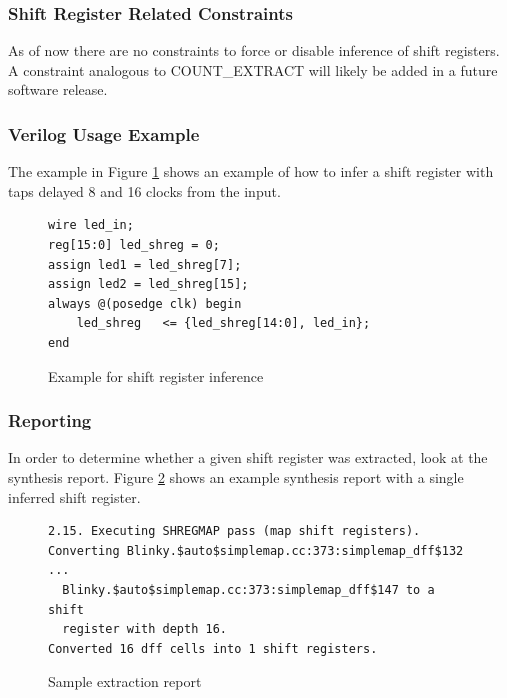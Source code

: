 \documentclass[11pt]{article}
\begin{document}
\subsubsection{Shift Register Related Constraints}

As of now there are no constraints to force or disable inference of shift registers. A constraint analogous to 
COUNT\_EXTRACT will likely be added in a future software release.

\clearpage
\subsubsection{Verilog Usage Example}

The example in Figure \ref{gp-shreginfer-example} shows an example of how to infer a shift register with taps delayed 8 
and 16 clocks from the input.

\begin{figure}[h]
\begin{lstlisting}
wire led_in;
reg[15:0] led_shreg = 0;
assign led1 = led_shreg[7];
assign led2 = led_shreg[15];
always @(posedge clk) begin
	led_shreg	<= {led_shreg[14:0], led_in};
end
\end{lstlisting}
\caption{Example for shift register inference}
\label{gp-shreginfer-example}
\end{figure}

\subsubsection{Reporting}

In order to determine whether a given shift register was extracted, look at the synthesis report. Figure 
\ref{shreg-extraction} shows an example synthesis report with a single inferred shift register.

\begin{figure}[h]
{\small
\begin{verbatim}
2.15. Executing SHREGMAP pass (map shift registers).
Converting Blinky.$auto$simplemap.cc:373:simplemap_dff$132 ...
  Blinky.$auto$simplemap.cc:373:simplemap_dff$147 to a shift
  register with depth 16.
Converted 16 dff cells into 1 shift registers.
\end{verbatim}
}
\caption{Sample extraction report}
\label{shreg-extraction}
\end{figure}

\end{document}
